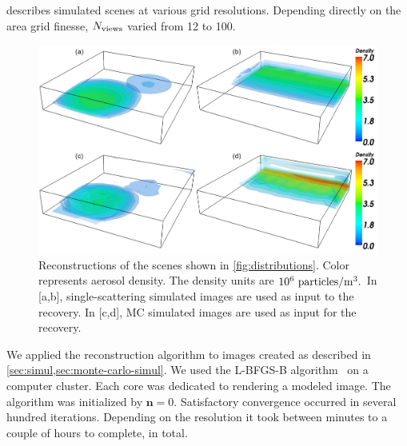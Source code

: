 \documentclass[10pt,letterpaper]{article}
\newcommand{\yoavcomment}[1]{}
\renewcommand{\yoavcomment}[1]{#1} %
\begin{document}
 describes simulated scenes at various grid
resolutions.  Depending directly on the area grid finesse, $N_{\rm
  views}$ varied from 12 to 100.
\begin{figure}[h]
  \centering
  \yoavcomment{\includegraphics[width=\columnwidth]{images/results}}
  \caption{\small Reconstructions of the scenes shown in
    \cref{fig:distributions}. Color represents aerosol density. The
    density units are $10^{6}~{\rm particles}/{\rm m}^3.$ In [a,b],
    single-scattering simulated images are used as input to the
    recovery.  In [c,d], MC simulated images are used as input for the
    recovery.  }
  \label{fig:results}
\end{figure}
We applied the reconstruction algorithm to images created as described
in \cref{sec:simul,sec:monte-carlo-simul}. We used the
L-BFGS-B algorithm~\cite{BFGS} on a computer cluster. Each core was
dedicated to rendering a modeled image. The algorithm was initialized
by ${\bm n}=0$.  Satisfactory convergence occurred in several hundred
iterations. Depending on the resolution it took between minutes to a
couple of hours to complete, in total.
\end{document}
